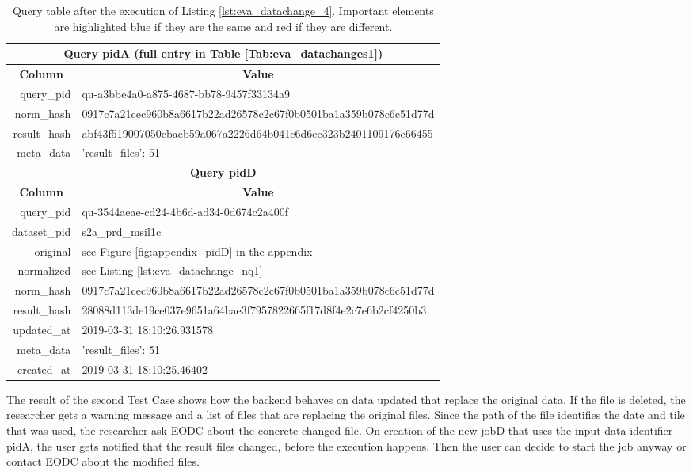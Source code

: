 \documentclass[draft,final]{vutinfth} %
\begin{document}
\begin{enumerate}
	\begin{table}[]
		\caption{Query table after the execution of Listing \ref{lst:eva_datachange_4}. Important elements are highlighted blue if they are the same and red if they are different.}
		\centering
		\begin{tabular}{|r|l|}
			\hline \multicolumn{2}{|c|}{\textbf{Query pidA (full entry in Table \ref{Tab:eva_datachanges1})}} \\
			\hline \multicolumn{1}{|c|}{\textbf{Column}}  &  \multicolumn{1}{c|}{\textbf{Value}} \\ \hline
			query\_pid & {\color{red}qu-a3bbe4a0-a875-4687-bb78-9457f33134a9}  \\ 
			norm\_hash & {\color{blue}0917c7a21cec960b8a6617b22ad26578c2c67f0b0501ba1a359b078c6c51d77d}  \\
			result\_hash & {\color{red}abf43f519007050cbaeb59a067a2226d64b041c6d6ec323b2401109176e66455}   \\
			meta\_data & {'result\_files': 51}  \\
			\hline \multicolumn{2}{|c|}{\textbf{Query pidD}} \\
			\hline \multicolumn{1}{|c|}{\textbf{Column}}  &  \multicolumn{1}{c|}{\textbf{Value}} \\ \hline
			query\_pid & { \color{red} qu-3544aeae-cd24-4b6d-ad34-0d674c2a400f}  \\ 
			dataset\_pid & s2a\_prd\_msil1c  \\ 
			original & see Figure \ref{fig:appendix_pidD} in the appendix \\
			normalized & see Listing \ref{lst:eva_datachange_nq1}  \\
			norm\_hash & {\color{blue}0917c7a21cec960b8a6617b22ad26578c2c67f0b0501ba1a359b078c6c51d77d}  \\
			result\_hash & {\color{red}28088d113de19ce037e9651a64bae3f7957822665f17d8f4e2c7e6b2cf4250b3}  \\
			updated\_at & 2019-03-31 18:10:26.931578   \\
			meta\_data & {'result\_files': 51}  \\
			created\_at & 2019-03-31 18:10:25.46402   \\ \hline
		\end{tabular}
		\label{Tab:eva_datachanges5}
	\end{table}
\end{enumerate}

The result of the second Test Case shows how the backend behaves on data updated that replace the original data. If the file is deleted, the researcher gets a warning message and a list of files that are replacing the original files. Since the path of the file identifies the date and tile that was used, the researcher ask EODC about the concrete changed file. On creation of the new jobD that uses the input data identifier pidA, the user gets notified that the result files changed, before the execution happens. Then the user can decide to start the job anyway or contact EODC about the modified files.
\end{document}
